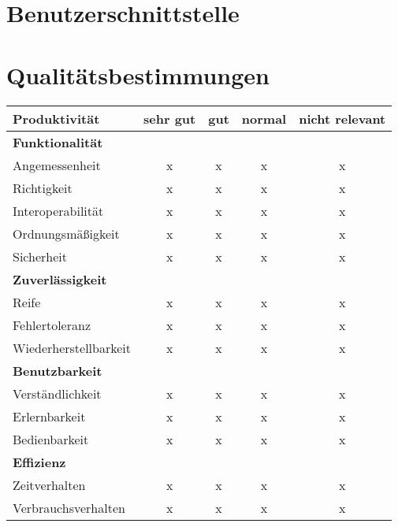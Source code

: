 \documentclass[parskip=full,11pt]{scrartcl}
\begin{document}
\section{Benutzerschnittstelle}

\section{Qualitätsbestimmungen}

\renewcommand{\arraystretch}{1.5}
\begin{table}[H]
  \begin{center}
    \begin{tabularx}{\textwidth}{X c c c c}
      \hline
      
      \textbf{{\large Produktivität}} & \textbf{{\large sehr gut}} & \textbf{{\large gut}} & \textbf{{\large normal} } &\textbf{{\large nicht relevant }}\\
      
      \hline      
      \multicolumn{5}{l}{\textbf{Funktionalität}}\\      
      \hline      
      Angemessenheit & x & x & x & x\\
	  Richtigkeit & x & x & x & x\\
	  Interoperabilität & x & x & x & x\\
	  Ordnungsmäßigkeit & x & x & x & x\\	
      Sicherheit & x & x & x & x\\	
		    
	  \hline	  
      \multicolumn{5}{l}{\textbf{Zuverlässigkeit}}\\     
      \hline
      Reife & x & x & x & x\\
	  Fehlertoleranz & x & x & x & x\\
	  Wiederherstellbarkeit & x & x & x & x\\
		
	  \hline	  	
	  \multicolumn{5}{l}{\textbf{Benutzbarkeit}}\\
      \hline
      Verständlichkeit & x & x & x & x\\
	  Erlernbarkeit & x & x & x & x\\
	  Bedienbarkeit & x & x & x & x\\
	  
	  \hline	  	
	  \multicolumn{5}{l}{\textbf{Effizienz}}\\
      \hline
      Zeitverhalten & x & x & x & x\\
	  Verbrauchsverhalten & x & x & x & x\\	
	  

\end{tabularx}
\end{center}
\end{table}
\end{document}
